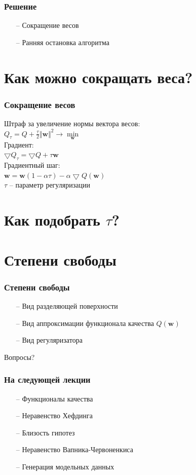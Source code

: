 \documentclass[10pt]{beamer}
\begin{document}
\begin{frame}\frametitle{Решение}
	\begin{itemize}
		\item[--] Сокращение весов
		\item[--] Ранняя остановка алгоритма
	\end{itemize}
\end{frame}

\section{Как можно сокращать веса?}

\begin{frame}\frametitle{Сокращение весов}
	Штраф за увеличение нормы вектора весов:\\
	$Q_{\tau} = Q + \frac{\tau}{2}\Vert \mathbf{w} \Vert^2 \rightarrow \min\limits_{\mathbf{w}}$\\
	\bigbreak
	Градиент:\\
	$\bigtriangledown Q_{\tau} = \bigtriangledown Q + \tau \mathbf{w}$\\
	\bigbreak
	Градиентный шаг:\\
	$\mathbf{w} = \mathbf{w}(1-\alpha \tau) - \alpha \bigtriangledown Q(\mathbf{w})$\\
	$\tau$ -- параметр регуляризации
\end{frame}

\section{Как подобрать $\tau$?}

\section{Степени свободы}

\begin{frame}\frametitle{Степени свободы}
	\begin{itemize}
		\item[--] Вид разделяющей поверхности
		\item[--] Вид аппроксимации функционала качества $Q(\mathbf{w})$
		\item[--] Вид регуляризатора
	\end{itemize}
\end{frame}

\begin{frame}[standout]
  Вопросы?
\end{frame}

\appendix

\begin{frame}\frametitle{На следующей лекции}
	\begin{itemize}
    	\item[--] Функционалы качества
    	\item[--] Неравенство Хефдинга
    	\item[--] Близость гипотез
    	\item[--] Неравенство Вапника-Червоненкиса
    	\item[--] Генерация модельных данных    	    	
	\end{itemize}
\end{frame}
\end{document}
